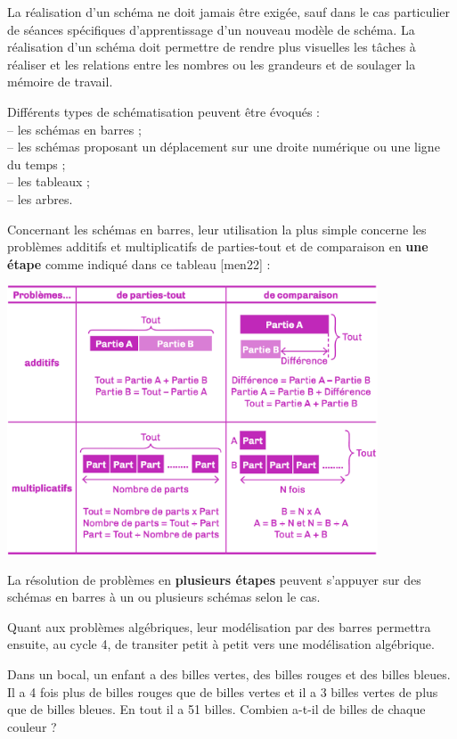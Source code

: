 La réalisation d’un schéma ne doit jamais être exigée, sauf dans le cas particulier de séances spécifiques d’apprentissage d’un nouveau modèle de schéma. La réalisation d’un schéma doit permettre de rendre plus visuelles les tâches à réaliser et les relations entre les nombres ou les grandeurs et de soulager la mémoire de travail. \medskip

Différents types de schématisation peuvent être évoqués : \\
-- les schémas en barres ; \\
-- les schémas proposant un déplacement sur une droite numérique ou une ligne du temps ; \\
-- les tableaux ; \\
-- les arbres.

Concernant les schémas en barres, leur utilisation la plus simple concerne les problèmes additifs et multiplicatifs de parties-tout et de comparaison en {\bf une étape} comme indiqué dans ce tableau [men22] :

\begin{center}
   \includegraphics[width=11cm]{Nombres_et_calculs_did/Images/Num2_cours_barres}
\end{center}

La résolution de problèmes en {\bf plusieurs étapes} peuvent s’appuyer sur des schémas en barres à un ou plusieurs schémas selon le cas. \medskip

Quant aux problèmes algébriques, leur modélisation par des barres permettra ensuite, au cycle 4, de transiter petit à petit vers une modélisation algébrique.

\begin{exemple*1}
   {\small Dans un bocal, un enfant a des billes vertes, des billes rouges et des billes bleues. Il a 4 fois plus de billes rouges que de billes vertes et il a 3 billes vertes de plus que de billes bleues. En tout il a 51 billes. Combien a-t-il de billes de chaque couleur ?}
\end{exemple*1}

